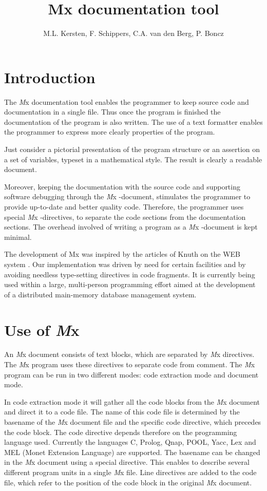 \documentclass{article}
\begin{document}
\newcommand{\Mx}{{\it M}x }
\title{Mx documentation tool}
\author{M.L. Kersten, F. Schippers, C.A. van den Berg, P. Boncz}
\maketitle

\section{Introduction}
The \Mx documentation tool enables the programmer to keep 
source code and documentation in a single file. Thus once the program 
is finished the documentation of the program is also written. 
The use of a text formatter enables the programmer to express more 
clearly properties of the program. 

Just consider a pictorial presentation of the program structure or an 
assertion on a set of variables, typeset in a mathematical style. 
The result is clearly a readable document. 

Moreover, keeping the documentation with the source code
and supporting software debugging through the \Mx-document,
stimulates the programmer to provide up-to-date and better quality code.
Therefore, the programmer uses special \Mx-directives, to separate
the code sections from the documentation sections. 
The overhead involved of writing a program as a \Mx-document is 
kept minimal.

The development of Mx was inspired by the articles of Knuth on the
WEB system \cite{Literate} \cite{Programming}. 
Our implementation was driven by need for certain facilities
and by avoiding needless type-setting directives in code fragments.
It is currently being used within a large, multi-person programming
effort aimed at the development of a distributed main-memory database
management system.

\newpage
\section{Use of \Mx}
An \Mx document consists of text blocks, which are separated by \Mx
directives. The \Mx program uses these directives to separate code
from comment. The \Mx program can be run in two different modes:
code extraction mode and document mode. 

In code extraction mode it will gather all the code blocks from the
\Mx document and direct it to a code file. The name of this code file
is determined by the basename of the \Mx document file and the specific
code directive, which precedes the code block. The code directive
depends therefore on the programming language used. Currently the
languages  C, Prolog, Qnap, POOL, Yacc, Lex and MEL (Monet Extension Language)
are supported.
The basename can be changed in the \Mx document using a special
directive. This enables to describe several different program units in
a single \Mx file. Line directives are added to the code file, 
which refer to the position of the code block in the original \Mx document. 
\end{document}
